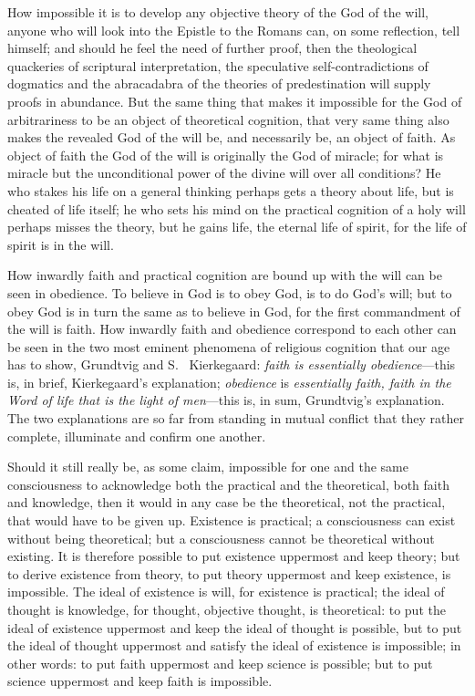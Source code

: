 \documentclass[12pt,a4paper]{article}
\newcommand{\opage}[1]{\marginnote{\footnotesize\textit{[#1]}}}
\begin{document}
How impossible it is to develop any objective theory of the God of the
will, anyone who will look into the Epistle to the Romans can, on
some reflection, tell himself; and should he feel the need of further
proof, then the theological quackeries of scriptural interpretation,
the speculative self-contradictions of dogmatics and the abracadabra
of the theories of predestination will supply proofs in abundance. But
the same thing that makes it impossible for the God of arbitrariness
to be an object of theoretical cognition, that very same thing also
makes the revealed God of the will be, and necessarily be, an object
of faith. As object of faith the God of the will is originally the God
of miracle; for what is miracle but the unconditional power of the
divine will over all conditions? He who stakes his life on a general
thinking perhaps gets a theory about life, but is cheated of life
itself; he who sets his mind on the practical cognition of a holy will
perhaps misses the theory, but he gains life, the eternal life of
spirit, for the life of spirit is in the will.

How inwardly faith and practical cognition are bound up with the will
can be seen in obedience. To believe in God is to obey God, is to do
God's will; but to obey God is in turn the same as to believe in God,
for the first commandment of the will is faith. How inwardly faith and
obedience correspond to each other can be seen in the two most eminent
phenomena of religious cognition that our age has to show, Grundtvig
and S.\
\opage{76}Kierkegaard: \emph{faith is essentially obedience}---this is,
in brief, Kierkegaard's explanation; \emph{obedience} is
\emph{essentially faith, faith in the Word of life that is the light
of men}---this is, in sum, Grundtvig's explanation. The two
explanations are so far from standing in mutual conflict that they
rather complete, illuminate and confirm one another.

Should it still really be, as some claim, impossible for one and the
same consciousness to acknowledge both the practical and the
theoretical, both faith and knowledge, then it would in any case be
the theoretical, not the practical, that would have to be given up.
Existence is practical; a consciousness can exist without being
theoretical; but a consciousness cannot be theoretical without
existing. It is therefore possible to put existence uppermost and keep
theory; but to derive existence from theory, to put theory uppermost
and keep existence, is impossible. The ideal of existence is will, for
existence is practical; the ideal of thought is knowledge, for
thought, objective thought, is theoretical: to put the ideal of
existence uppermost and keep the ideal of thought is possible, but to
put the ideal of thought uppermost and satisfy the ideal of existence
is impossible; in other words: to put faith uppermost and keep science
is possible; but to put science uppermost and keep faith is
impossible.
\end{document}
